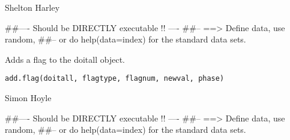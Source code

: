 \documentclass[a4paper]{book}
\begin{document}
%
\begin{Author}\relax

Shelton Harley
\end{Author}
%
\begin{Examples}
\begin{ExampleCode}
##---- Should be DIRECTLY executable !! ----
##-- ==>  Define data, use random,
##--	or do  help(data=index)  for the standard data sets.

\end{ExampleCode}
\end{Examples}
%
\begin{Description}\relax

Adds a flag to the doitall object. 
\end{Description}
%
\begin{Usage}
\begin{verbatim}
add.flag(doitall, flagtype, flagnum, newval, phase)
\end{verbatim}
\end{Usage}
%
\begin{Arguments}
\begin{ldescription}
\item[\code{doitall}] 


\item[\code{flagtype}] 


\item[\code{flagnum}] 


\item[\code{newval}] 


\item[\code{phase}] 


\end{ldescription}
\end{Arguments}
%
\begin{Author}\relax

Simon Hoyle
\end{Author}
%
\begin{Examples}
\begin{ExampleCode}
##---- Should be DIRECTLY executable !! ----
##-- ==>  Define data, use random,
##--	or do  help(data=index)  for the standard data sets.

\end{ExampleCode}
\end{Examples}
\end{document}
